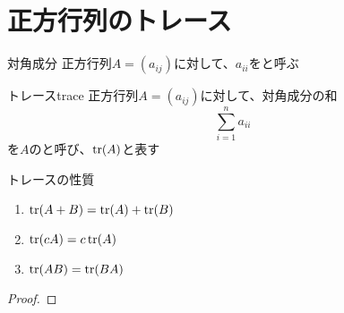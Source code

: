 \documentclass[../../../topic_linear-algebra]{subfiles}
\begin{document}
\sectionline
\section{正方行列のトレース}

\begin{definition*}{対角成分}
  正方行列$A = (a_{ij})$に対して、$a_{ii}$をと呼ぶ
\end{definition*}

\begin{definition}{トレース}{trace}
  正方行列$A=(a_{ij})$に対して、対角成分の和
  \begin{equation*}
    \sum_{i=1}^n a_{ii}
  \end{equation*}
  を$A$のと呼び、$\tr(A)$と表す
\end{definition}

\begin{theorem*}{トレースの性質}
  \begin{enumerate}[label=\romanlabel]
    \item $\tr(A+B) = \tr(A) + \tr(B)$
    \item $\tr(cA) = c\tr(A)$
    \item $\tr(AB) = \tr(BA)$
  \end{enumerate}
\end{theorem*}

\begin{proof}
\end{proof}
\end{document}
